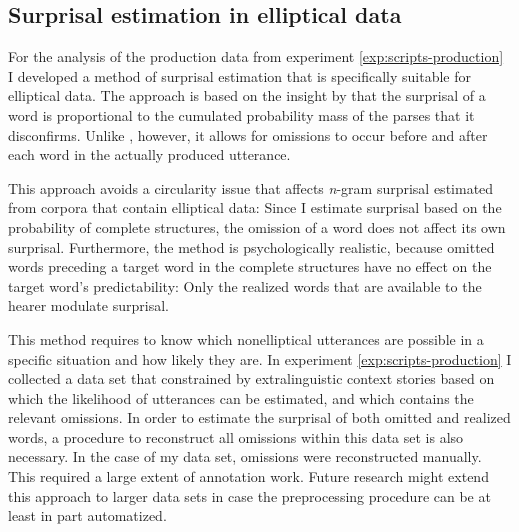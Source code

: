 \subsection{Surprisal estimation in elliptical data}
For the analysis of the production data from experiment \ref{exp:scripts-production} I developed a method of surprisal estimation that is specifically suitable for elliptical data. The approach is based on the insight by \citet{hale2001} that the surprisal of a word is proportional to the cumulated probability mass of the parses that it disconfirms. Unlike \citet{hale2001}, however, it allows for omissions to occur before and after each word in the actually produced utterance. 

This approach avoids a circularity issue that affects \textit{n}-gram surprisal estimated from corpora that contain elliptical data: Since I estimate surprisal based on the probability of complete structures, the omission of a word does not affect its own surprisal. Furthermore, the method is psychologically realistic, because omitted words preceding a target word in the complete structures have no effect on the target word's predictability: Only the realized words that are available to the hearer modulate surprisal. %

This method requires to know which nonelliptical utterances are possible in a specific situation and how likely they are. In experiment \ref{exp:scripts-production} I collected a data set that constrained by extralinguistic context stories based on which the likelihood of utterances can be estimated, and which contains the relevant omissions. In order to estimate the surprisal of both omitted and realized words, a procedure to reconstruct all omissions within this data set is also necessary. In the case of my data set, omissions were reconstructed manually. This required a large extent of annotation work. Future research might extend this approach to larger data sets in case the preprocessing procedure can be at least in part automatized.

\newpage

